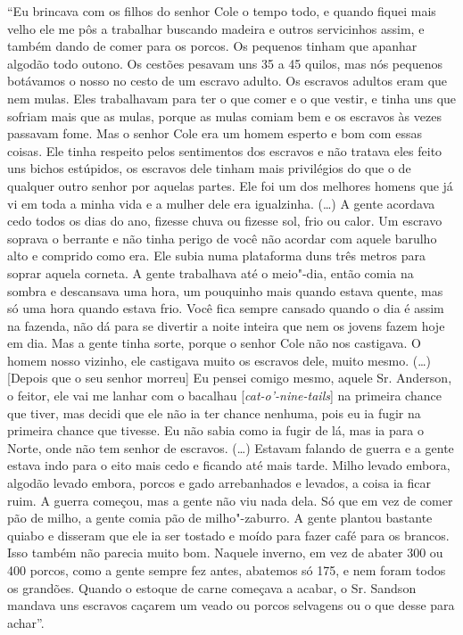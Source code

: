 ``Eu brincava com os filhos do senhor Cole o tempo todo, e quando fiquei
mais velho ele me pôs a trabalhar buscando madeira e outros servicinhos
assim, e também dando de comer para os porcos. Os pequenos tinham que
apanhar algodão todo outono. Os cestões pesavam uns 35 a 45 quilos, mas
nós pequenos botávamos o nosso no cesto de um escravo adulto. Os
escravos adultos eram que nem mulas. Eles trabalhavam para ter o que
comer e o que vestir, e tinha uns que sofriam mais que as mulas, porque
as mulas comiam bem e os escravos às vezes passavam fome. Mas o senhor
Cole era um homem esperto e bom com essas coisas. Ele tinha respeito
pelos sentimentos dos escravos e não tratava eles feito uns bichos
estúpidos, os escravos dele tinham mais privilégios do que o de qualquer
outro senhor por aquelas partes. Ele foi um dos melhores homens que já
vi em toda a minha vida e a mulher dele era igualzinha. (\ldots{}) A
gente acordava cedo todos os dias do ano, fizesse chuva ou fizesse sol,
frio ou calor. Um escravo soprava o berrante e não tinha perigo de você
não acordar com aquele barulho alto e comprido como era. Ele subia numa
plataforma duns três metros para soprar aquela corneta. A gente
trabalhava até o meio"-dia, então comia na sombra e descansava uma hora,
um pouquinho mais quando estava quente, mas só uma hora quando estava
frio. Você fica sempre cansado quando o dia é assim na fazenda, não dá
para se divertir a noite inteira que nem os jovens fazem hoje em dia.
Mas a gente tinha sorte, porque o senhor Cole não nos castigava. O homem
nosso vizinho, ele castigava muito os escravos dele, muito mesmo.
(\ldots{}) {[}Depois que o seu senhor morreu{]} Eu pensei comigo mesmo,
aquele Sr. Anderson, o feitor, ele vai me lanhar com o bacalhau
{[}\emph{cat-o'-nine-tails}{]} na primeira chance que tiver, mas decidi que ele
não ia ter chance nenhuma, pois eu ia fugir na primeira chance que
tivesse. Eu não sabia como ia fugir de lá, mas ia para o Norte, onde não
tem senhor de escravos. (\ldots{}) Estavam falando de guerra e a gente
estava indo para o eito mais cedo e ficando até mais tarde. Milho levado
embora, algodão levado embora, porcos e gado arrebanhados e levados, a
coisa ia ficar ruim. A guerra começou, mas a gente não viu nada dela. Só
que em vez de comer pão de milho, a gente comia pão de milho"-zaburro. A
gente plantou bastante quiabo e disseram que ele ia ser tostado e moído
para fazer café para os brancos. Isso também não parecia muito bom.
Naquele inverno, em vez de abater 300 ou 400 porcos, como a gente sempre
fez antes, abatemos só 175, e nem foram todos os grandões. Quando o
estoque de carne começava a acabar, o Sr. Sandson mandava uns escravos
caçarem um veado ou porcos selvagens ou o que desse para achar''.

